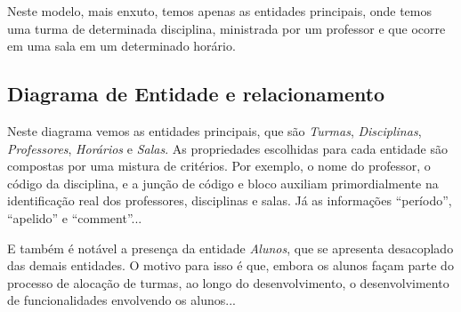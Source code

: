 

Neste modelo, mais enxuto, temos apenas as entidades principais, onde temos uma turma de determinada disciplina, ministrada por um professor e que ocorre em uma sala em um determinado horário.

\subsection{Diagrama de Entidade e relacionamento} %



Neste diagrama vemos as entidades principais, que são \textit{Turmas}, \textit{Disciplinas}, \textit{Professores}, \textit{Horários} e \textit{Salas}. As propriedades escolhidas para cada entidade são compostas por uma mistura de critérios. Por exemplo, o nome do professor, o código da disciplina, e a junção de código e bloco auxiliam primordialmente na identificação real dos professores, disciplinas e salas. Já as informações ``período'', ``apelido'' e ``comment''...

E também é notável a presença da entidade \textit{Alunos}, que se apresenta desacoplado das demais entidades. O motivo para isso é que, embora os alunos façam parte do processo de alocação de turmas, ao longo do desenvolvimento, o desenvolvimento de funcionalidades envolvendo os alunos...

